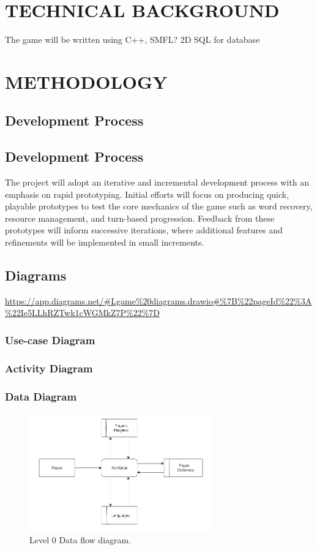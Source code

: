 \documentclass[11pt]{article}
\begin{document}
\section{TECHNICAL BACKGROUND}
The game will be written using C++, SMFL? 2D
SQL for database

\section{METHODOLOGY}
\subsection{Development Process}
\subsection{Development Process}
The project will adopt an iterative and incremental development process with an emphasis on rapid prototyping. 
Initial efforts will focus on producing quick, playable prototypes to test the core mechanics of the game such as word recovery, resource management, and turn-based progression. 
Feedback from these prototypes will inform successive iterations, where additional features and refinements will be implemented in small increments. 

\subsection{Diagrams}
\url{https://app.diagrams.net/#Lgame%20diagrams.drawio#%7B%22pageId%22%3A%22Ie5LLhRZTwk1cWGMkZ7P%22%7D}

\subsubsection{Use-case Diagram}
\subsubsection{Activity Diagram}
\subsubsection{Data Diagram}

\begin{figure}[h!]
  \centering
  \includegraphics[width=0.7\textwidth]{diagrams/dfd01.png}
  \caption{Level 0 Data flow diagram.}
  \label{fig:dfd0}
\end{figure}
\end{document}
